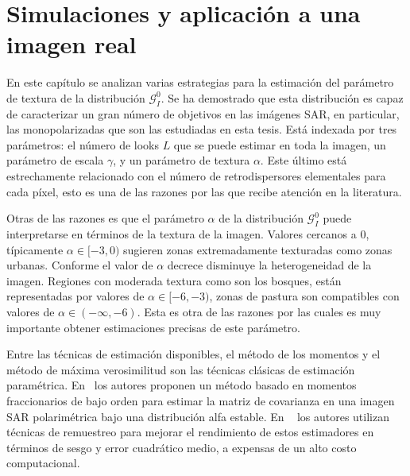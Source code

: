 
\chapter{Simulaciones y aplicación a una imagen real}
\label{ResultadosEmpiricos}


En este capítulo se analizan varias estrategias para la estimación del parámetro de textura de la distribución $\mathcal{G}_I^0$.
Se ha demostrado que esta distribución es capaz de caracterizar un gran número de objetivos en las imágenes SAR, en particular, las monopolarizadas que son las estudiadas en esta tesis. Está indexada por
tres parámetros: el número de looks $L$ que se puede estimar en toda la imagen, un parámetro de escala $\gamma$, y un parámetro de textura $\alpha$. Este último está estrechamente relacionado con el número
de retrodispersores elementales para cada píxel, esto es una de las razones por las que recibe atención en la literatura. 

Otras de las razones es que el parámetro $\alpha$ de la distribución $\mathcal{G}_I^0$ puede interpretarse en términos de la textura de la imagen. Valores cercanos a $0$, típicamente $\alpha \in [-3,0)$ sugieren zonas extremadamente texturadas como zonas urbanas. Conforme el valor de $\alpha$ decrece disminuye la heterogeneidad de la imagen. Regiones con moderada textura como son los bosques, están representadas por valores de $\alpha \in [-6,-3)$, zonas de pastura son compatibles con valores de $\alpha \in (-\infty,-6)$. Esta es otra de las razones por las cuales es muy importante obtener estimaciones precisas de este parámetro.

Entre las técnicas de estimación disponibles, el método de los momentos y el método de máxima verosimilitud son las técnicas clásicas de estimación paramétrica. En~\cite{Bian2013} los autores proponen un método basado en
momentos fraccionarios de bajo orden para estimar la matriz de covarianza en una imagen SAR polarimétrica bajo una distribución alfa estable. En ~\cite{VasconcellosFrerySilva:CompStat,CribariFrerySilva:CSDA} los autores utilizan técnicas de remuestreo para mejorar el rendimiento de estos estimadores en términos de sesgo y error cuadrático medio, a expensas de un alto costo computacional.

